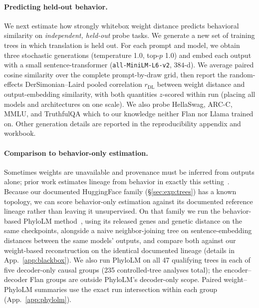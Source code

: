 \documentclass{article}
\theoremstyle{definition}
\theoremstyle{plain}
\begin{document}
\paragraph{Predicting held-out behavior.}
\label{sec:exp:behavioral}
We next estimate how strongly whitebox weight distance predicts behavioral similarity on \textit{independent, held-out} probe tasks. We generate a new set of training trees in which translation is held out. For each prompt and model, we obtain three stochastic generations (temperature 1.0, top-$p$ 1.0) and embed each output with a small sentence-transformer (\texttt{all-MiniLM-L6-v2}, $384$-d). We average paired cosine similarity over the complete prompt-by-draw grid, then report the random-effects DerSimonian--Laird \citep{dersimonianlaird1986} pooled correlation $r_{\mathrm{DL}}$ between weight distance and output-embedding similarity, with both quantities $z$-scored within run (placing all models and architectures on one scale). We also probe HellaSwag, ARC-C, MMLU, and TruthfulQA which to our knowledge neither Flan nor Llama trained on. Other generation details are reported in the reproducibility appendix and workbook.




\paragraph{Comparison to behavior-only estimation.}
\label{sec:exp:blackbox}
Sometimes weights are unavailable and provenance must be inferred from outputs alone; prior work estimates lineage from behavior in exactly this setting~\citep{wu2026llmdna, yax2025phylolm}. Because our documented HuggingFace family (\S\ref{sec:exp:trees}) has a known topology, we can score behavior-only estimation against its documented reference lineage rather than leaving it unsupervised. On that family we run the behavior-based PhyloLM method~\citep{yax2025phylolm}, using its released genes and genetic distance on the same checkpoints, alongside a naive neighbor-joining tree on sentence-embedding distances between the same models' outputs, and compare both against our weight-based reconstruction on the identical documented lineage (details in App.~\ref{app:blackbox}). We also run PhyloLM on all 47 qualifying trees in each of five decoder-only causal groups (235 controlled-tree analyses total); the encoder--decoder Flan groups are outside PhyloLM's decoder-only scope. Paired weight--PhyloLM summaries use the exact run intersection within each group (App.~\ref{app:phylolm}).
\end{document}
